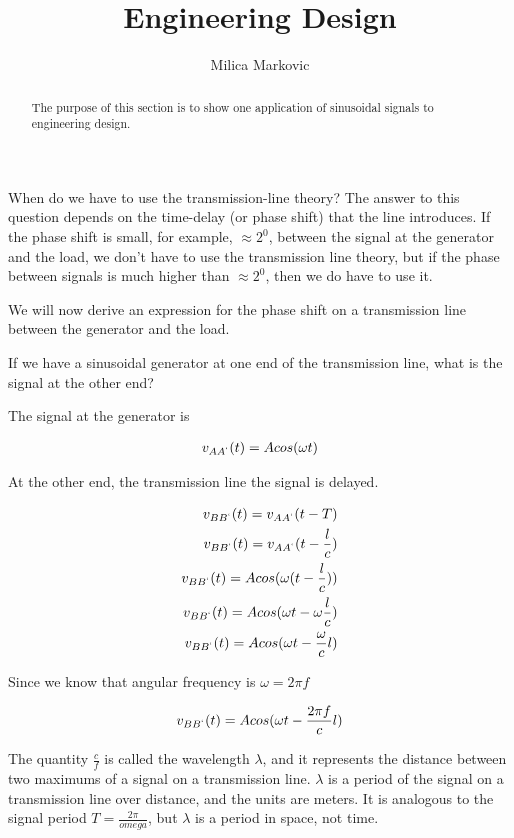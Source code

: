 \documentclass{ximera}
\title{Engineering Design}
\author{Milica Markovic}
\begin{document}
  
\begin{abstract}  
The purpose of this section is to show one application of sinusoidal signals to engineering design.
\end{abstract}  
\maketitle

When do we have to use the transmission-line theory? The answer to this question depends on the time-delay (or phase shift) that the line introduces. If the phase shift is small, for example, $\approx 2^0$, between the signal at the generator and the load, we don't have to use the transmission line theory, but if the phase between signals is much higher than  $\approx 2^0$, then we do have to use it.

We will now derive an expression for the phase shift on a transmission line between the generator and the load.

If we have a sinusoidal generator at one end of the transmission line, what is the signal at the other end?

The signal at the generator is 

\begin{eqnarray}
v_{AA^`}(t)=A cos(\omega t)
\end{eqnarray}

At the other end, the transmission line the signal is delayed.


\begin{eqnarray}
v_{BB^`}(t)=v_{AA^`}(t-T) \\
v_{BB^`}(t)=v_{AA^`}(t-\frac{l}{c}) \\
v_{BB^`}(t)=A cos(\omega (t - \frac{l}{c}))  \\
v_{BB^`}(t)=A cos(\omega t - \omega \frac{l}{c}) \\
v_{BB^`}(t)=A cos(\omega t -  \frac{\omega }{c} l) 
\end{eqnarray}

Since we know that angular frequency is  $\omega = 2 \pi f$


\begin{eqnarray}
v_{BB^`}(t)=A cos(\omega t -  \frac{ 2 \pi f }{c} l)
\end{eqnarray}

The quantity $\frac{c}{f}$ is called the wavelength $\lambda$, and it represents the distance between two maximums of a signal on a transmission line.  $\lambda$ is a period of the signal on a transmission line over distance, and the units are meters. It is analogous to the signal period $T=\frac{2 \pi}{omega}$, but $\lambda$ is a period in space, not time.
\end{document}
